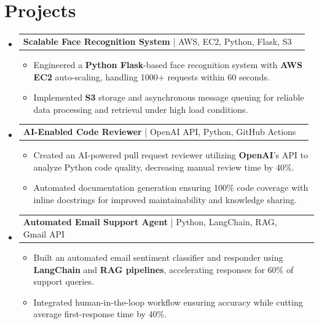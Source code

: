 \documentclass[letterpaper,11pt]{article}
\makeatletter
\newcommand{\resumeItem}[1]{
  \item\footnotesize{
    {#1 \vspace{-2pt}}
  }
}
\newcommand{\resumeProjectHeading}[2]{
    \item
    \begin{tabular*}{1.001\textwidth}{l@{\extracolsep{\fill}}r}
      \small#1 & \textbf{\small #2}\\
    \end{tabular*}\vspace{-7pt}
}
\newcommand{\resumeSubHeadingListStart}{\begin{itemize}[leftmargin=0pt, label={}]}
\newcommand{\resumeSubHeadingListEnd}{\end{itemize}}
\newcommand{\resumeItemListStart}{\begin{itemize}[leftmargin=*]}
\newcommand{\resumeItemListEnd}{\end{itemize}\vspace{-5pt}}
\makeatother
\begin{document}
\section{Projects}
    \vspace{-5pt}
    \resumeSubHeadingListStart
          \resumeProjectHeading
              {\textbf{Scalable Face Recognition System} | AWS, EC2, Python, Flask, S3}{}
        \resumeItemListStart
            \resumeItem{Engineered a \textbf{Python Flask}-based face recognition system with \textbf{AWS EC2} auto-scaling, handling 1000+ requests within 60 seconds.}
            \resumeItem{Implemented \textbf{S3} storage and asynchronous message queuing for reliable data processing and retrieval under high load conditions.}
        \resumeItemListEnd
        \vspace{-12pt}
    
    \resumeProjectHeading
        {\textbf{AI-Enabled Code Reviewer} | OpenAI API, Python, GitHub Actions}{}
        \resumeItemListStart
            \resumeItem{Created an AI-powered pull request reviewer utilizing \textbf{OpenAI}'s API to analyze Python code quality, decreasing manual review time by 40\%.}
            \resumeItem{Automated documentation generation ensuring 100\% code coverage with inline docstrings for improved maintainability and knowledge sharing.}
        \resumeItemListEnd
          \vspace{-12pt}
      \resumeProjectHeading
          {\textbf{Automated Email Support Agent} | Python, LangChain, RAG, Gmail API}{}
          \resumeItemListStart
              \resumeItem{Built an automated email sentiment classifier and responder using \textbf{LangChain} and \textbf{RAG pipelines}, accelerating responses for 60\% of support queries.}
              \resumeItem{Integrated human-in-the-loop workflow ensuring accuracy while cutting average first-response time by 40\%.}
          \resumeItemListEnd 
    \resumeSubHeadingListEnd
\end{document}
